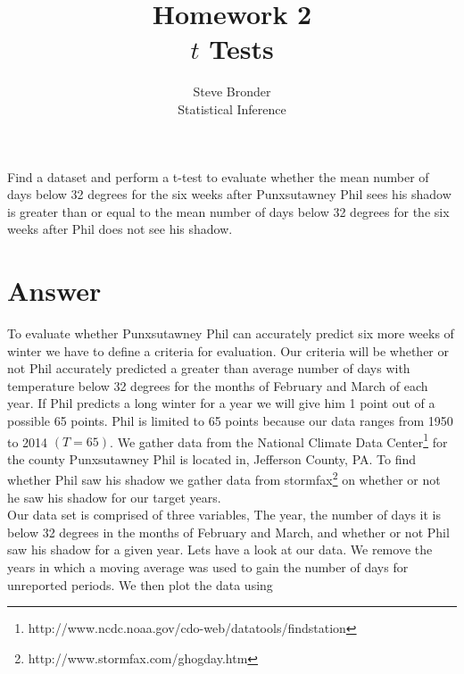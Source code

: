 \documentclass[12pt]{article}\usepackage[]{graphicx}\usepackage[]{color}
\newenvironment{exercise}[2][Exercise]{\begin{trivlist}
\item[\hskip \labelsep {\bfseries #1}\hskip \labelsep {\bfseries #2.}]}{\end{trivlist}}
\begin{document}
 
 
\title{Homework 2\\
$t$ Tests}%
\author{Steve Bronder\\ %
Statistical Inference} %
 
\maketitle
 
\begin{exercise}{1}Find a dataset and perform a t-test to evaluate whether the mean number of days below 32 degrees for the six weeks after Punxsutawney Phil sees his shadow is greater than or equal to the mean number of days below 32 degrees for the six weeks after Phil does not see his shadow.
\end{exercise}

\section*{Answer}

To evaluate whether Punxsutawney Phil can accurately predict six more weeks of winter we have to define a criteria for evaluation. Our criteria will be whether or not Phil accurately predicted a greater than average number of days with temperature below 32 degrees for the months of February and March of each year. If Phil predicts a long winter for a year we will give him 1 point out of a possible 65 points. Phil is limited to 65 points because our data ranges from 1950 to 2014 $(T=65)$. We gather data from the National Climate Data Center\footnote{http://www.ncdc.noaa.gov/cdo-web/datatools/findstation} for the county Punxsutawney Phil is located in, Jefferson County, PA. To find whether Phil saw his shadow we gather data from stormfax\footnote{http://www.stormfax.com/ghogday.htm} on whether or not he saw his shadow for our target years. \\

 Our data set is comprised of three variables, The year, the number of days it is below 32 degrees in the months of February and March, and whether or not Phil saw his shadow for a given year. Lets have a look at our data. We remove the years in which a moving average was used to gain the number of days for unreported periods. We then plot the data using 
 
\end{document}
